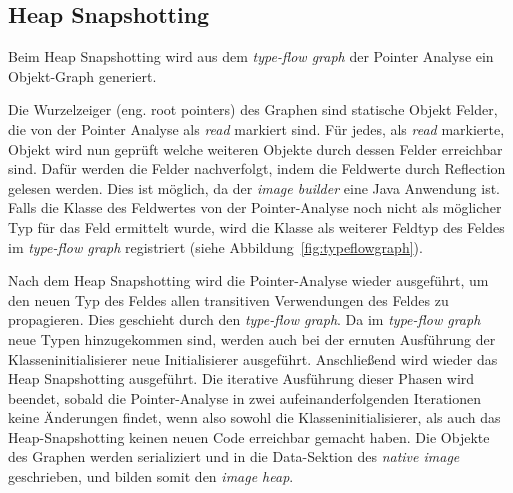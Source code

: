 \subsection{Heap Snapshotting}
\label{subsec:heapsnapshotting}
Beim Heap Snapshotting wird aus dem \textit{type-flow graph} der Pointer Analyse ein Objekt-Graph generiert.

Die Wurzelzeiger (eng. root pointers) des Graphen sind statische Objekt Felder, die von der Pointer Analyse als \textit{read} markiert sind. Für jedes, als \textit{read} markierte, Objekt wird nun geprüft welche weiteren Objekte durch dessen Felder erreichbar sind. 
Dafür werden die Felder nachverfolgt, indem die Feldwerte durch Reflection gelesen werden. Dies ist möglich, da der \textit{image builder} eine Java Anwendung ist.
 Falls die Klasse des Feldwertes von der Pointer-Analyse noch nicht als möglicher Typ für das Feld ermittelt 
 wurde, wird die Klasse als weiterer Feldtyp des Feldes im \textit{type-flow graph} registriert (siehe Abbildung~\ref{fig:typeflowgraph}).

Nach dem Heap Snapshotting wird die Pointer-Analyse wieder ausgeführt, um den neuen Typ des Feldes allen transitiven Verwendungen des Feldes zu propagieren. Dies geschieht durch den \textit{type-flow graph}. 
Da im \textit{type-flow graph} neue Typen hinzugekommen sind, werden auch bei der ernuten Ausführung der Klasseninitialisierer neue Initialisierer ausgeführt. Anschließend wird wieder das Heap Snapshotting ausgeführt. 
Die iterative Ausführung dieser Phasen wird beendet, sobald die Pointer-Analyse in zwei aufeinanderfolgenden Iterationen keine Änderungen findet, wenn also sowohl die Klasseninitialisierer, als auch das Heap-Snapshotting keinen neuen Code erreichbar gemacht haben.
Die Objekte des Graphen werden serializiert und in die Data-Sektion des \textit{native image} geschrieben, und bilden somit den \textit{image heap}\parencite{Wimmer2019}.
